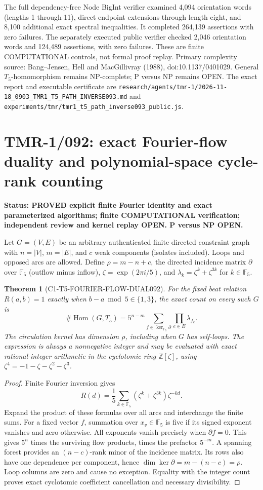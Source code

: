 \documentclass[11pt]{article}
\newtheorem{theorem}{Theorem}
\begin{document}
The full dependency-free Node BigInt verifier examined 4,094
orientation words (lengths 1 through 11), direct endpoint
extensions through length eight, and 8,100 additional exact
spectral inequalities. It completed 264,139 assertions with
zero failures. The separately executed public verifier checked
2,046 orientation words and 124,489 assertions, with zero failures.
These are finite COMPUTATIONAL controls, not formal proof replay.
Primary complexity source: Bang--Jensen, Hell and MacGillivray
(1988), doi:10.1137/0401029. General $T_5$-homomorphism
remains NP-complete; P versus NP remains OPEN.
The exact report and executable certificate are
\texttt{research/agents/tmr-1/2026-11-18\_0903\_TMR1\_T5\_PATH\_INVERSE093.md}
and \texttt{experiments/tmr/tmr1\_t5\_path\_inverse093\_public.js}.
\par

\section{TMR-1/092: exact Fourier-flow duality and polynomial-space cycle-rank counting}
\noindent\textbf{Status: PROVED explicit finite Fourier identity and exact parameterized
algorithms; finite COMPUTATIONAL verification; independent review and kernel
replay OPEN. P versus NP OPEN.}

Let $G=(V,E)$ be an arbitrary authenticated finite directed constraint graph
with $n=|V|$, $m=|E|$, and $c$ weak components (isolates included).
Loops and opposed arcs are allowed. Define $\rho=m-n+c$, the directed
incidence matrix $\partial$ over $\mathbb F_5$ (outflow minus inflow),
$\zeta=\exp(2\pi i/5)$, and
$\lambda_k=\zeta^k+\zeta^{3k}$ for $k\in\mathbb F_5$.

\begin{theorem}[C1-T5-FOURIER-FLOW-DUAL092]
For the fixed beat relation $R(a,b)=1$ exactly when
$b-a\bmod 5\in\{1,3\}$, the exact count on every such $G$ is
\[
\boxed{\#\operatorname{Hom}(G,T_5)
 =5^{n-m}\sum_{f\in\ker_{\mathbb F_5}\partial}
       \prod_{e\in E}\lambda_{f_e}.}
\]
The circulation kernel has dimension $\rho$, including when $G$ has
self-loops. The expression is always a nonnegative integer and may be
evaluated with exact rational-integer arithmetic in the cyclotomic ring
$\mathbb Z[\zeta]$, using
$\zeta^4=-1-\zeta-\zeta^2-\zeta^3$.
\end{theorem}
\begin{proof}
Finite Fourier inversion gives
\[
R(d)=\frac{1}{5}\sum_{k\in\mathbb F_5}
       (\zeta^k+\zeta^{3k})\zeta^{-kd}.
\]
Expand the product of these formulas over all arcs and interchange the
finite sums. For a fixed vector $f$, summation over $x_v\in\mathbb F_5$
is five if its signed exponent vanishes and zero otherwise. All exponents
vanish precisely when $\partial f=0$. This gives $5^n$ times the
surviving flow products, times the prefactor $5^{-m}$. A spanning forest
provides an $(n-c)$-rank minor of the incidence matrix. Its rows also
have one dependence per component, hence
$\dim\ker\partial=m-(n-c)=\rho$. Loop columns are zero and cause no
exception. Equality with the integer count proves exact cyclotomic
coefficient cancellation and necessary divisibility.
\end{proof}
\end{document}
